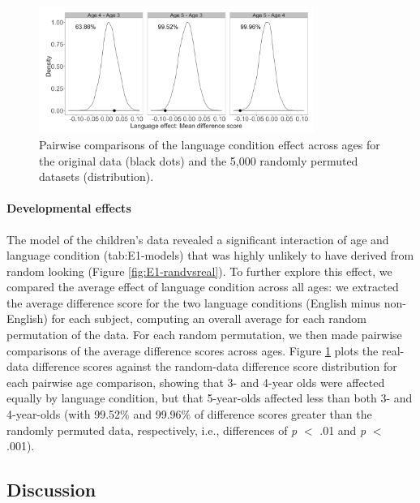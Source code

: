 \documentclass[authoryear, 12pt]{elsarticle}
\begin{document}
\begin{figure}[h!]
\begin{center}
\includegraphics[width=0.8\textwidth]{figures/E1-child-randvsreal-ttest-agebylg.png}
\end{center}
\caption{Pairwise comparisons of the language condition effect across ages for the original data (black dots) and the 5,000 randomly permuted datasets (distribution).} 
\label{fig:E1-lgageinteraction}
\end{figure}

\paragraph{Developmental effects}
The model of the children's data revealed a significant interaction of age and language condition (tab:E1-models) that was highly unlikely to have derived from random looking (Figure \ref{fig:E1-randvsreal}). To further explore this effect, we compared the average effect of language condition across all ages: we extracted the average difference score for the two language conditions (English minus non-English) for each subject, computing an overall average for each random permutation of the data. For each random permutation, we then made pairwise comparisons of the average difference scores across ages. Figure \ref{fig:E1-lgageinteraction} plots the real-data difference scores against the random-data difference score distribution for each pairwise age comparison, showing that 3- and 4-year olds were affected equally by language condition, but that 5-year-olds affected less than both 3- and 4-year-olds (with 99.52\% and 99.96\% of difference scores greater than the randomly permuted data, respectively, i.e., differences of \textit{p} $<$ .01 and \textit{p} $<$ .001).

\subsection{Discussion}
\label{sec:discussion1}
\end{document}
